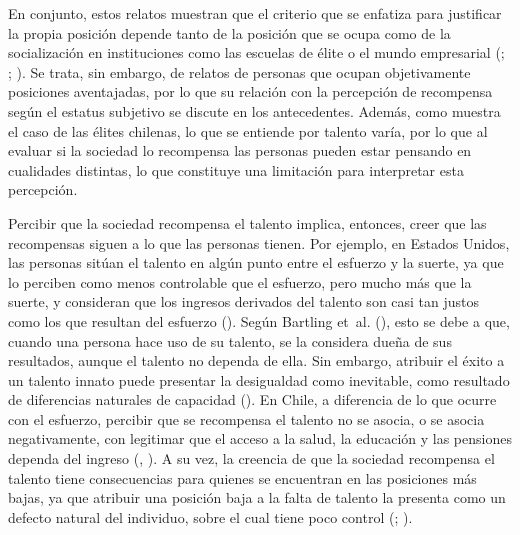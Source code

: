 \documentclass[
  spanish,
  a4paper,
  oneside]{scrbook}
\begin{document}
En conjunto, estos relatos muestran que el criterio que se enfatiza para
justificar la propia posición depende tanto de la posición que se ocupa
como de la socialización en instituciones como las escuelas de élite o
el mundo empresarial
(; ;
). Se
trata, sin embargo, de relatos de personas que ocupan objetivamente
posiciones aventajadas, por lo que su relación con la percepción de
recompensa según el estatus subjetivo se discute en los antecedentes.
Además, como muestra el caso de las élites chilenas, lo que se entiende
por talento varía, por lo que al evaluar si la sociedad lo recompensa
las personas pueden estar pensando en cualidades distintas, lo que
constituye una limitación para interpretar esta percepción.

Percibir que la sociedad recompensa el talento implica, entonces, creer
que las recompensas siguen a lo que las personas tienen. Por ejemplo, en
Estados Unidos, las personas sitúan el talento en algún punto entre el
esfuerzo y la suerte, ya que lo perciben como menos controlable que el
esfuerzo, pero mucho más que la suerte, y consideran que los ingresos
derivados del talento son casi tan justos como los que resultan del
esfuerzo (). Según Bartling et~al. (),
esto se debe a que, cuando una persona hace uso de su talento, se la
considera dueña de sus resultados, aunque el talento no dependa de ella.
Sin embargo, atribuir el éxito a un talento innato puede presentar la
desigualdad como inevitable, como resultado de diferencias naturales de
capacidad ().
En Chile, a diferencia de lo que ocurre con el esfuerzo, percibir que se
recompensa el talento no se asocia, o se asocia negativamente, con
legitimar que el acceso a la salud, la educación y las pensiones dependa
del ingreso (,
).
A su vez, la creencia de que la sociedad recompensa el talento tiene
consecuencias para quienes se encuentran en las posiciones más bajas, ya
que atribuir una posición baja a la falta de talento la presenta como un
defecto natural del individuo, sobre el cual tiene poco control
(;
).
\end{document}

